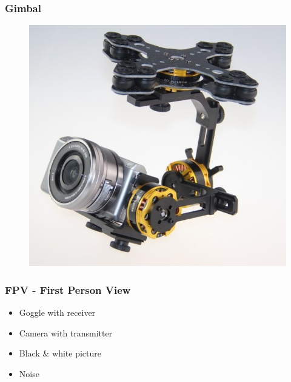 \begin{frame}
\frametitle{Gimbal}

  \begin{figure}
  \includegraphics[scale=0.4]{pic/03_our-copter/gimbal.jpg}
  \end{figure}
  
\end{frame}



\begin{frame}
\frametitle{FPV - First Person View}

  \begin{itemize}
    \item Goggle with receiver
  	\item Camera with transmitter
	\item Black \& white picture
	\item Noise 
  \end{itemize}
  
\end{frame}



  

